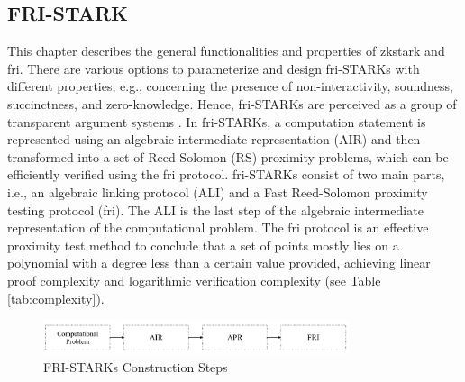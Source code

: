 \subsection{FRI-STARK}
This chapter describes the general functionalities and properties of \acrshort{zkstark} and \acrshort{fri}. There are various options to parameterize and design \acrshort{fri}-STARKs with different properties, e.g., concerning the presence of non-interactivity, soundness, succinctness, and zero-knowledge. Hence, \acrshort{fri}-STARKs are perceived as a group of transparent argument systems \citep{zkstark}. In \acrshort{fri}-STARKs, a computation statement is represented using an algebraic intermediate representation (AIR) and then transformed into a set of Reed-Solomon (RS) proximity problems, which can be efficiently verified using the \acrshort{fri} protocol. \acrshort{fri}-STARKs consist of two main parts, i.e., an algebraic linking protocol (ALI) and a Fast Reed-Solomon proximity testing protocol (\acrshort{fri}). The ALI is the last step of the algebraic intermediate representation of the computational problem. The \acrshort{fri} protocol is an effective proximity test method to conclude that a set of points mostly lies on a polynomial with a degree less than a certain value provided, achieving linear proof complexity and logarithmic verification complexity (see Table \ref{tab:complexity}). 
\begin{figure}[hbt]
	\centering
	\includegraphics[width=0.8\textwidth]{Pictures/zkstark.png}
	\caption{FRI-STARKs Construction Steps}
	\label{fig:fristark}
\end{figure}
